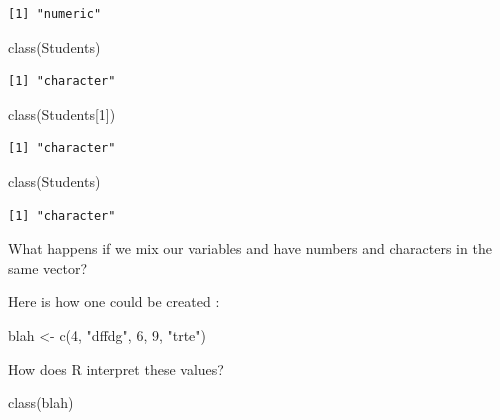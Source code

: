 \documentclass[
  letterpaper,
  DIV=11,
  numbers=noendperiod]{scrreprt}
\newenvironment{Shaded}{\begin{snugshade}}{\end{snugshade}}
\newcommand{\DecValTok}[1]{\textcolor[rgb]{0.68,0.00,0.00}{#1}}
\newcommand{\FunctionTok}[1]{\textcolor[rgb]{0.28,0.35,0.67}{#1}}
\newcommand{\NormalTok}[1]{\textcolor[rgb]{0.00,0.23,0.31}{#1}}
\newcommand{\OtherTok}[1]{\textcolor[rgb]{0.00,0.23,0.31}{#1}}
\newcommand{\StringTok}[1]{\textcolor[rgb]{0.13,0.47,0.30}{#1}}
\begin{document}
\begin{verbatim}
[1] "numeric"
\end{verbatim}

\begin{Shaded}
\begin{Highlighting}[]
\FunctionTok{class}\NormalTok{(Students)}
\end{Highlighting}
\end{Shaded}

\begin{verbatim}
[1] "character"
\end{verbatim}

\begin{Shaded}
\begin{Highlighting}[]
\FunctionTok{class}\NormalTok{(Students[}\DecValTok{1}\NormalTok{])}
\end{Highlighting}
\end{Shaded}

\begin{verbatim}
[1] "character"
\end{verbatim}

\begin{Shaded}
\begin{Highlighting}[]
\FunctionTok{class}\NormalTok{(Students)}
\end{Highlighting}
\end{Shaded}

\begin{verbatim}
[1] "character"
\end{verbatim}

What happens if we mix our variables and have numbers and characters in
the same vector?

Here is how one could be created :

\begin{Shaded}
\begin{Highlighting}[]
\NormalTok{blah }\OtherTok{\textless{}{-}} \FunctionTok{c}\NormalTok{(}\DecValTok{4}\NormalTok{, }\StringTok{"dffdg"}\NormalTok{, }\DecValTok{6}\NormalTok{, }\DecValTok{9}\NormalTok{, }\StringTok{"trte"}\NormalTok{)}
\end{Highlighting}
\end{Shaded}

How does R interpret these values?

\begin{Shaded}
\begin{Highlighting}[]
\FunctionTok{class}\NormalTok{(blah)}
\end{Highlighting}
\end{Shaded}
\end{document}
